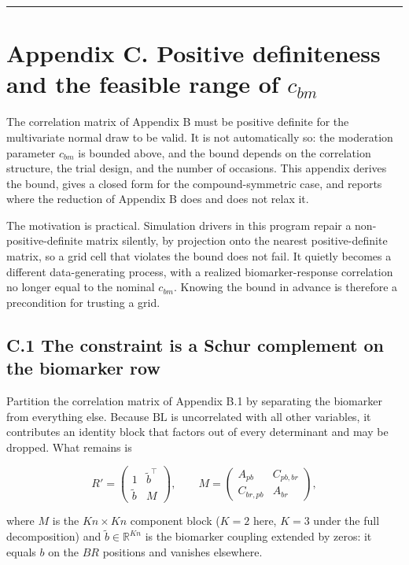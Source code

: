 \documentclass[
  11pt,
]{article}
\begin{document}
\bigskip\noindent

\rule{\textwidth}{0.4pt}\bigskip

\section{Appendix C. Positive definiteness and the feasible range of
$c_{bm}$}

The correlation matrix of Appendix B must be positive definite for
the multivariate normal draw to be valid. It is not automatically so:
the moderation parameter \(c_{bm}\) is bounded above, and the bound
depends on the correlation structure, the trial design, and the
number of occasions. This appendix derives the bound, gives a closed
form for the compound-symmetric case, and reports where the reduction
of Appendix B does and does not relax it.

The motivation is practical. Simulation drivers in this program
repair a non-positive-definite matrix silently, by projection onto
the nearest positive-definite matrix, so a grid cell that violates
the bound does not fail. It quietly becomes a different
data-generating process, with a realized biomarker-response
correlation no longer equal to the nominal \(c_{bm}\). Knowing the
bound in advance is therefore a precondition for trusting a grid.

\subsection{C.1 The constraint is a Schur complement on the biomarker
row}

Partition the correlation matrix of Appendix B.1 by separating the
biomarker from everything else. Because \(\mathrm{BL}\) is uncorrelated
with all other variables, it contributes an identity block that
factors out of every determinant and may be dropped. What remains is

\[
R' =
\begin{pmatrix}
1 & \tilde b^{\top} \\
\tilde b & M
\end{pmatrix},
\qquad
M =
\begin{pmatrix}
A_{pb} & C_{pb,br}\\
C_{br,pb} & A_{br}
\end{pmatrix},
\]

where \(M\) is the \(Kn \times Kn\) component block (\(K = 2\) here, \(K =
3\) under the full decomposition) and \(\tilde b \in \mathbb{R}^{Kn}\)
is the biomarker coupling extended by zeros: it equals \(b\) on the
\(BR\) positions and vanishes elsewhere.
\end{document}

